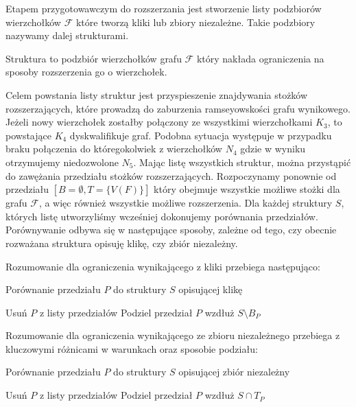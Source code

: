 Etapem przygotowawczym do rozszerzania jest stworzenie listy podzbiorów wierzchołków $\mathcal{F}$ które tworzą kliki lub zbiory niezależne. Takie podzbiory nazywamy dalej strukturami.
\begin{definition} Struktura to podzbiór wierzchołków grafu $\mathcal{F}$ który nakłada ograniczenia na sposoby rozszerzenia go o wierzchołek.
\end{definition}
Celem powstania listy struktur jest przyspieszenie znajdywania stożków rozszerzających, które prowadzą do zaburzenia ramseyowskości grafu wynikowego. Jeżeli nowy wierzchołek zostałby połączony ze wszystkimi wierzchołkami $K_3$, to powstające $K_4$ dyskwalifikuje graf. Podobna sytuacja występuje w przypadku braku połączenia do któregokolwiek z wierzchołków $N_4$ gdzie w wyniku otrzymujemy niedozwolone $N_5$. 
Mając listę wszystkich struktur, można przystąpić do zawężania przedziału stożków rozszerzających. Rozpoczynamy ponownie od przedziału $[B = \emptyset, T = \{V(F)\} ]$ który obejmuje wszystkie możliwe stożki dla grafu $\mathcal{F}$, a więc również wszystkie możliwe rozszerzenia. Dla każdej struktury $S$, których listę utworzyliśmy wcześniej dokonujemy porównania przedziałów. Porównywanie odbywa się w następujące sposoby, zależne od tego, czy obecnie rozważana struktura opisuję klikę, czy zbiór niezależny.

Rozumowanie dla ograniczenia wynikającego z kliki przebiega następująco:
\begin{algorithm}[H]
  \caption{Porównanie przedziału $P$ do struktury $S$ opisującej klikę}
  \begin{algorithmic}
	  \STATE Usuń $P$ z listy przedziałów
	\ELSE
	  \STATE Podziel przedział $P$ wzdłuż $S \setminus B_P  $
  	\ENDIF
  \ENDIF  
  \end{algorithmic}
\end{algorithm}

Rozumowanie dla ograniczenia wynikającego ze zbioru niezależnego przebiega z kluczowymi różnicami w warunkach oraz sposobie podziału:

\begin{algorithm}[H]
  \caption{Porównanie przedziału $P$ do struktury $S$ opisującej zbiór niezależny}
  \begin{algorithmic}
	  \STATE Usuń $P$ z listy przedziałów
	\ELSE
	  \STATE Podziel przedział $P$ wzdłuż $S \cap T_P  $
  	\ENDIF
  \ENDIF  
  \end{algorithmic}
\end{algorithm}

